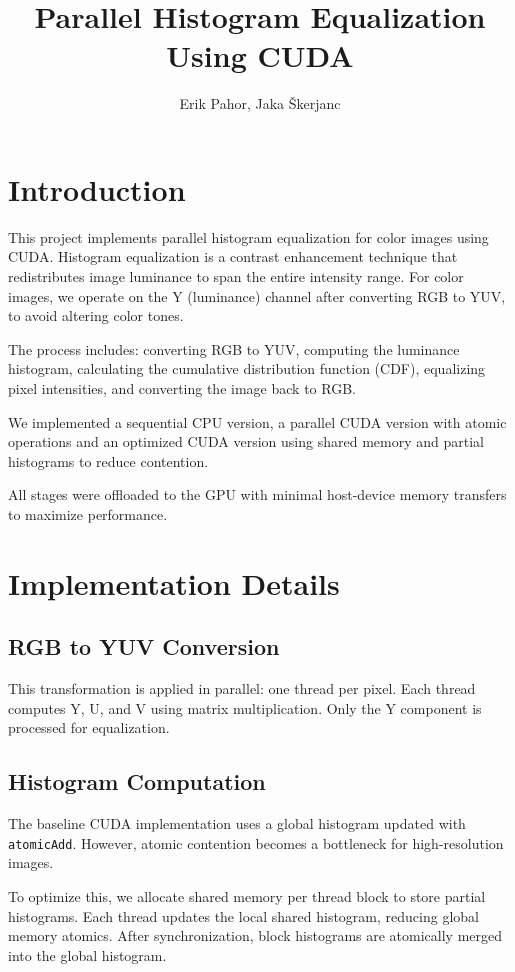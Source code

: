 \documentclass[9pt]{IEEEtran}
\title{\vspace{0ex}Parallel Histogram Equalization Using CUDA}
\author{Erik Pahor, Jaka Škerjanc\vspace{-4.0ex}}
\begin{document}
\maketitle

\section{Introduction}
This project implements parallel histogram equalization for color images using CUDA. Histogram equalization is a contrast enhancement technique that redistributes image luminance to span the entire intensity range. For color images, we operate on the Y (luminance) channel after converting RGB to YUV, to avoid altering color tones.

The process includes: converting RGB to YUV, computing the luminance histogram, calculating the cumulative distribution function (CDF), equalizing pixel intensities, and converting the image back to RGB.

We implemented a sequential CPU version, a parallel CUDA version with atomic operations and an optimized CUDA version using shared memory and partial histograms to reduce contention.

All stages were offloaded to the GPU with minimal host-device memory transfers to maximize performance.

\section{Implementation Details}

\subsection{RGB to YUV Conversion}
This transformation is applied in parallel: one thread per pixel. Each thread computes Y, U, and V using matrix multiplication. Only the Y component is processed for equalization.

\subsection{Histogram Computation}
The baseline CUDA implementation uses a global histogram updated with \texttt{atomicAdd}. However, atomic contention becomes a bottleneck for high-resolution images.

To optimize this, we allocate shared memory per thread block to store partial histograms. Each thread updates the local shared histogram, reducing global memory atomics. After synchronization, block histograms are atomically merged into the global histogram.
\end{document}
